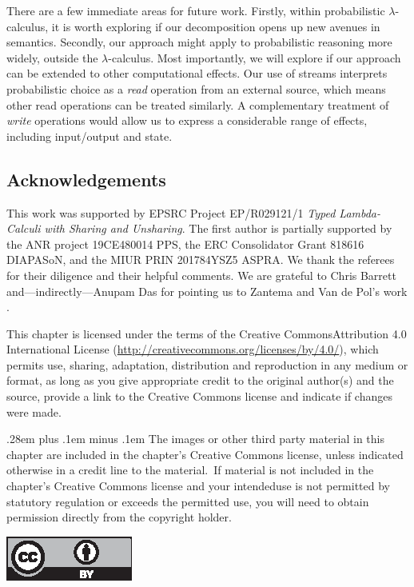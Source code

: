 \documentclass[runningheads,orivec]{llncs}
\theoremstyle{definition}
\theoremstyle{plain}
\newcommand\+[1][{}]{\kern1pt{\smallbin\oplus}_{#1}\kern1pt}
\newcommand\1{\bullet}
\newcommand\0{\circ}
\begin{document}
There are a few immediate areas for future work. Firstly, within probabilistic $\lambda$-calculus, it is worth exploring if our decomposition opens up new avenues in semantics. Secondly, our approach might apply to probabilistic reasoning more widely, outside the $\lambda$-calculus. Most importantly, we will explore if our approach can be extended to other computational effects. Our use of streams interprets probabilistic choice as a \emph{read} operation from an external source, which means other read operations can be treated similarly. A complementary treatment of \emph{write} operations would allow us to express a considerable range of effects, including input/output and state.

\subsection*{Acknowledgements}

This work was supported by EPSRC Project EP/R029121/1 \emph{Typed Lambda-Calculi with Sharing and Unsharing}.
The first author is partially supported by the ANR project 19CE480014 PPS, the ERC Consolidator Grant 
818616 DIAPASoN, and the MIUR PRIN 201784YSZ5 ASPRA.
We thank the referees for their diligence and their helpful comments. 
We are grateful to Chris Barrett and---indirectly---Anupam Das for pointing us to Zantema and Van de Pol's work \cite{Zantema-Pol-2001}.






\newpage
\vspace*{\fill}

{\small\medskip{} This chapter is licensed under the terms of the Creative Commons\break Attribution 4.0 International License (\url{http://creativecommons.org/licenses/by/4.0/}), which permits use, sharing, adaptation, distribution and reproduction in any medium or format, as long as you give appropriate credit to the original author(s) and the source, provide a link to the Creative Commons license and indicate if changes were made.}

{\small \spaceskip .28em plus .1em minus .1em The images or other third party material in this chapter are included in the chapter's Creative Commons license, unless indicated otherwise in a credit line to the material.~If material is not included in the chapter's Creative Commons license and your intended\break use is not permitted by statutory regulation or exceeds the permitted use, you will need to obtain permission directly from the copyright holder.}

\medskip\noindent\includegraphics{cc_by_4-0.eps}
\end{document}
